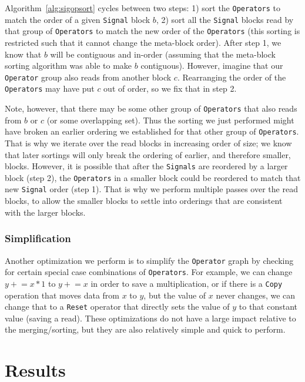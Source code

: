 \documentclass{article}
\begin{document}
Algorithm~\ref{alg:sigopsort} cycles between two steps: 1) sort the \texttt{Operators} to match the order of a given \texttt{Signal} block $b$, 2) sort all the \texttt{Signal} blocks read by that group of \texttt{Operators} to match the new order of the \texttt{Operators} (this sorting is restricted such that it cannot change the meta-block order).  After step 1, we know that $b$ will be contiguous and in-order (assuming that the meta-block sorting algorithm was able to make $b$ contiguous).  However, imagine that our \texttt{Operator} group also reads from another block $c$.  Rearranging the order of the \texttt{Operators} may have put $c$ out of order, so we fix that in step 2.  

Note, however, that there may be some other group of \texttt{Operators} that also reads from $b$ or $c$ (or some overlapping set).  Thus the sorting we just performed might have broken an earlier ordering we established for that other group of \texttt{Operators}.  That is why we iterate over the read blocks in increasing order of size; we know that later sortings will only break the ordering of earlier, and therefore smaller, blocks.  However, it is possible that after the \texttt{Signals} are reordered by a larger block (step 2), the \texttt{Operators} in a smaller block could be reordered to match that new \texttt{Signal} order (step 1).  That is why we perform multiple passes over the read blocks, to allow the smaller blocks to settle into orderings that are consistent with the larger blocks.

\subsubsection{Simplification}

Another optimization we perform is to simplify the \texttt{Operator} graph by checking for certain special case combinations of \texttt{Operators}.  For example, we can change $y\mathrel{+}=x*1$ to $y\mathrel{+}=x$ in order to save a multiplication, or if there is a \texttt{Copy} operation that moves data from $x$ to $y$, but the value of $x$ never changes, we can change that to a \texttt{Reset} operator that directly sets the value of $y$ to that constant value (saving a read).  These optimizations do not have a large impact relative to the merging/sorting, but they are also relatively simple and quick to perform.

\section{Results}
\end{document}

